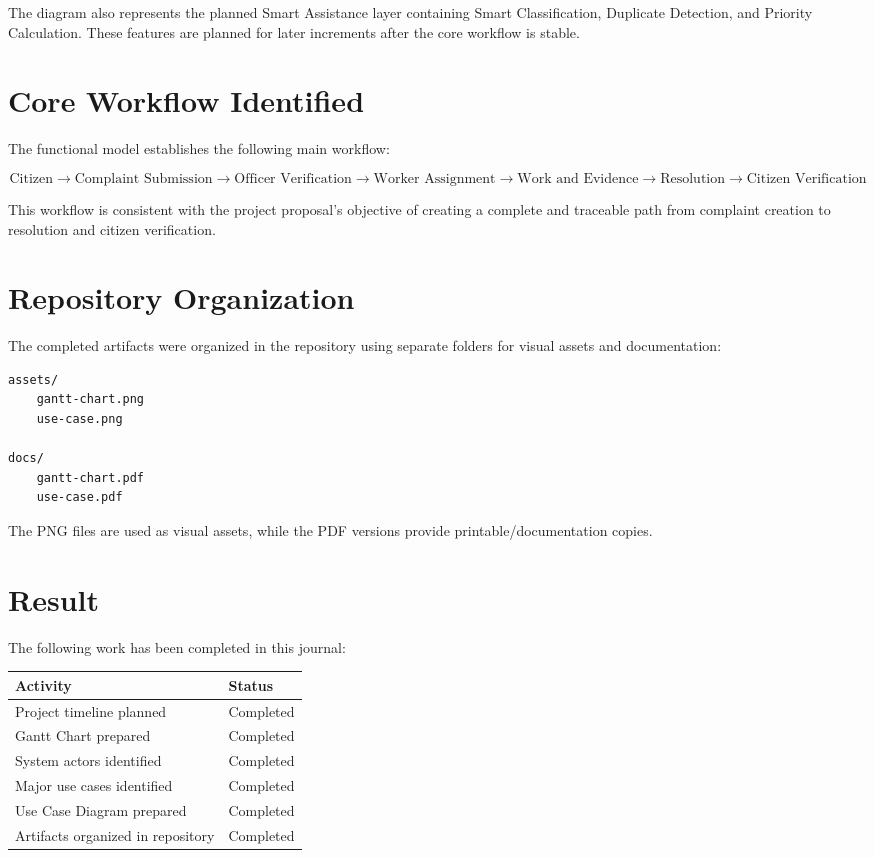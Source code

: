 \documentclass[12pt,a4paper]{article}
\begin{document}
The diagram also represents the planned Smart Assistance layer containing Smart Classification, Duplicate Detection, and Priority Calculation. These features are planned for later increments after the core workflow is stable.

\section{Core Workflow Identified}

The functional model establishes the following main workflow:

\[
\text{Citizen} \rightarrow
\text{Complaint Submission} \rightarrow
\text{Officer Verification} \rightarrow
\text{Worker Assignment} \rightarrow
\text{Work and Evidence} \rightarrow
\text{Resolution} \rightarrow
\text{Citizen Verification}
\]

This workflow is consistent with the project proposal's objective of creating a complete and traceable path from complaint creation to resolution and citizen verification.

\section{Repository Organization}

The completed artifacts were organized in the repository using separate folders for visual assets and documentation:

\begin{verbatim}
assets/
    gantt-chart.png
    use-case.png

docs/
    gantt-chart.pdf
    use-case.pdf
\end{verbatim}

The PNG files are used as visual assets, while the PDF versions provide printable/documentation copies.

\section{Result}

The following work has been completed in this journal:

\begin{table}[h]
\centering
\begin{tabular}{p{} p{}}
\toprule
\textbf{Activity} & \textbf{Status} \\
\midrule
Project timeline planned & Completed \\
Gantt Chart prepared & Completed \\
System actors identified & Completed \\
Major use cases identified & Completed \\
Use Case Diagram prepared & Completed \\
Artifacts organized in repository & Completed \\
\bottomrule
\end{tabular}
\end{table}
\end{document}
